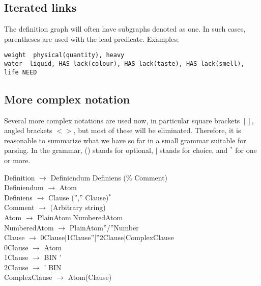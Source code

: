 \documentclass[11pt,bookmarks,bookmarksnumbered,naturalnames,plainpages=false,pdftex,colorlinks=true,urlcolor=blue,bookmarksdepth=subsection,plainpages=false]{paper}
\begin{document}
\subsection{Iterated links} 

The definition graph will often have subgraphs denoted as one. In such cases,
parentheses are used with the lead predicate. Examples: 

\begin{verbatim}
weight  physical(quantity), heavy
water  liquid, HAS lack(colour), HAS lack(taste), HAS lack(smell), life NEED
\end{verbatim}

\subsection{More complex notation}

Several more complex notations are used now, in particular square brackets $[ ]$,
angled brackets $< >$, but most of these will be eliminated. Therefore, it is
reasonable to summarize what we have so far in a small grammar suitable for
parsing. In the grammar, () stands for optional, $|$ stands for choice, and
$^*$ for one or more. 

\noindent
Definition $\rightarrow$ Definiendum Definiens (\% Comment)\\
Definiendum $\rightarrow$ Atom\\
Definiens $\rightarrow$ Clause ('','' Clause)$^*$\\
Comment  $\rightarrow$ (Arbitrary string)\\
Atom  $\rightarrow$ PlainAtom$|$NumberedAtom\\
NumberedAtom  $\rightarrow$ PlainAtom''/''Number\\
Clause  $\rightarrow$ 0Clause$|$1Clause''|''2Clause|ComplexClause\\
0Clause  $\rightarrow$ Atom\\
1Clause  $\rightarrow$ BIN '\\
2Clause   $\rightarrow$ ' BIN\\
ComplexClause  $\rightarrow$ Atom(Clause)
\end{document}
